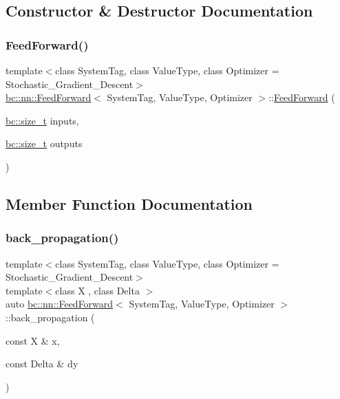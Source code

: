 \subsection{Constructor \& Destructor Documentation}
\mbox{\label{structbc_1_1nn_1_1FeedForward_a98c53bf9790896a468efff3e8c4ac651}} 
\subsubsection{\texorpdfstring{Feed\+Forward()}{FeedForward()}}
{\footnotesize\ttfamily template$<$class System\+Tag, class Value\+Type, class Optimizer = Stochastic\+\_\+\+Gradient\+\_\+\+Descent$>$ \\
\hyperlink{structbc_1_1nn_1_1FeedForward}{bc\+::nn\+::\+Feed\+Forward}$<$ System\+Tag, Value\+Type, Optimizer $>$\+::\hyperlink{structbc_1_1nn_1_1FeedForward}{Feed\+Forward} (\begin{DoxyParamCaption}\item[{\hyperlink{namespacebc_aaf8e3fbf99b04b1b57c4f80c6f55d3c5}{bc\+::size\+\_\+t}}]{inputs,  }\item[{\hyperlink{namespacebc_aaf8e3fbf99b04b1b57c4f80c6f55d3c5}{bc\+::size\+\_\+t}}]{outputs }\end{DoxyParamCaption})\hspace{0.3cm}{\ttfamily [inline]}}



\subsection{Member Function Documentation}
\mbox{\label{structbc_1_1nn_1_1FeedForward_a3f712a67e12f12634ecd6ff40d7d0727}} 
\subsubsection{\texorpdfstring{back\+\_\+propagation()}{back\_propagation()}}
{\footnotesize\ttfamily template$<$class System\+Tag, class Value\+Type, class Optimizer = Stochastic\+\_\+\+Gradient\+\_\+\+Descent$>$ \\
template$<$class X , class Delta $>$ \\
auto \hyperlink{structbc_1_1nn_1_1FeedForward}{bc\+::nn\+::\+Feed\+Forward}$<$ System\+Tag, Value\+Type, Optimizer $>$\+::back\+\_\+propagation (\begin{DoxyParamCaption}\item[{const X \&}]{x,  }\item[{const Delta \&}]{dy }\end{DoxyParamCaption})\hspace{0.3cm}{\ttfamily [inline]}}

